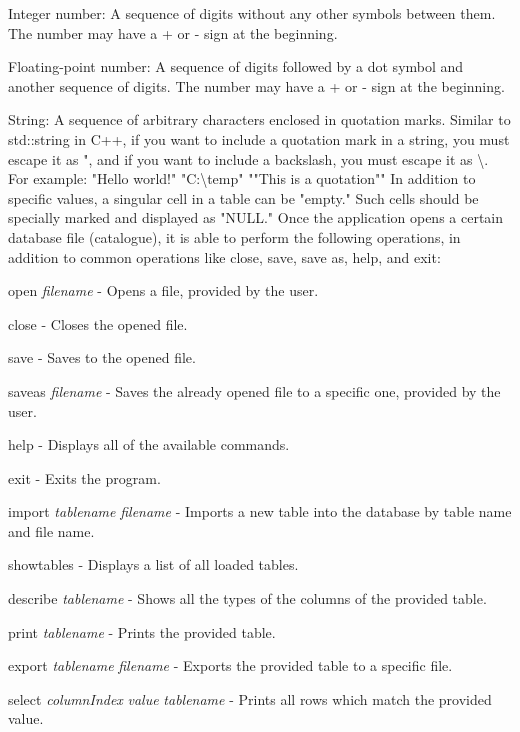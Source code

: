 \begin{DoxyItemize}
\item Integer number\+: A sequence of digits without any other symbols between them. The number may have a \textquotesingle{}+\textquotesingle{} or \textquotesingle{}-\/\textquotesingle{} sign at the beginning.
\item Floating-\/point number\+: A sequence of digits followed by a dot symbol and another sequence of digits. The number may have a \textquotesingle{}+\textquotesingle{} or \textquotesingle{}-\/\textquotesingle{} sign at the beginning.
\item String\+: A sequence of arbitrary characters enclosed in quotation marks. Similar to std\+::string in C++, if you want to include a quotation mark in a string, you must escape it as "{}, and if you want to include a backslash, you must escape it as \textbackslash{}. For example\+: "{}Hello world!"{} "{}C\+:\textbackslash{}temp"{} "{}"{}This is a quotation"{}"{} In addition to specific values, a singular cell in a table can be "{}empty."{} Such cells should be specially marked and displayed as "{}\+NULL."{} Once the application opens a certain database file (catalogue), it is able to perform the following operations, in addition to common operations like close, save, save as, help, and exit\+:
\item open {\itshape filename} -\/ Opens a file, provided by the user.
\item close -\/ Closes the opened file.
\item save -\/ Saves to the opened file.
\item saveas {\itshape filename} -\/ Saves the already opened file to a specific one, provided by the user.
\item help -\/ Displays all of the available commands.
\item exit -\/ Exits the program.
\item import {\itshape tablename} {\itshape filename} -\/ Imports a new table into the database by table name and file name.
\item showtables -\/ Displays a list of all loaded tables.
\item describe {\itshape tablename} -\/ Shows all the types of the columns of the provided table.
\item print {\itshape tablename} -\/ Prints the provided table.
\item export {\itshape tablename} {\itshape filename} -\/ Exports the provided table to a specific file.
\item select {\itshape column\+Index} {\itshape value} {\itshape tablename} -\/ Prints all rows which match the provided value.

\end{DoxyItemize}
